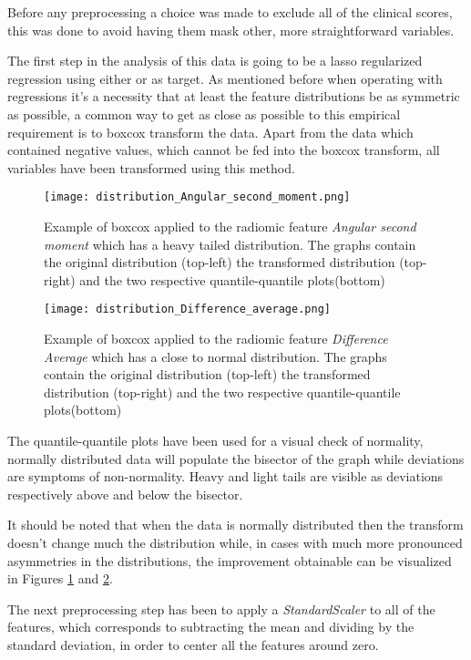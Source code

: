 Before any preprocessing a choice was made to exclude all of the clinical scores, this was done to avoid having them mask other, more straightforward variables.

The first step in the analysis of this data is going to be a lasso regularized regression using either \death or \icu as target. As mentioned before when operating with regressions it's a necessity that at least the feature distributions be as symmetric as possible, a common way to get as close as possible to this empirical requirement is to boxcox transform the data. Apart from the data which contained negative values, which cannot be fed into the boxcox transform, all variables have been transformed using this method.

\begin{figure}[htbp]
  		\texttt{[image: distribution\_Angular\_second\_moment.png]}
        \caption{Example of boxcox applied to the radiomic feature \textit{Angular second moment} which has a heavy tailed distribution. The graphs contain the original distribution (top-left) the transformed distribution (top-right) and the two respective quantile-quantile plots(bottom) \label{fig:boxcox_example}}
\end{figure}

\begin{figure}[htbp]
  		\texttt{[image: distribution\_Difference\_average.png]}
        \caption{Example of boxcox applied to the radiomic feature \textit{Difference Average} which has a close to normal distribution. The graphs contain the original distribution (top-left) the transformed distribution (top-right) and the two respective quantile-quantile plots(bottom) \label{fig:boxcox_example_normal}}
\end{figure}

The quantile-quantile plots have been used for a visual check of normality, normally distributed data will populate the bisector of the graph while deviations are symptoms of non-normality. Heavy and light tails are visible as deviations respectively above and below the bisector.

It should be noted that when the data is normally distributed then the transform doesn't change much the distribution while, in cases with much more pronounced asymmetries in the distributions, the improvement obtainable can be visualized in Figures \ref{fig:boxcox_example} and \ref{fig:boxcox_example_normal}.

The next preprocessing step has been to apply a \textit{StandardScaler} to all of the features, which corresponds to subtracting the mean and dividing by the standard deviation, in order to center all the features around zero. 

